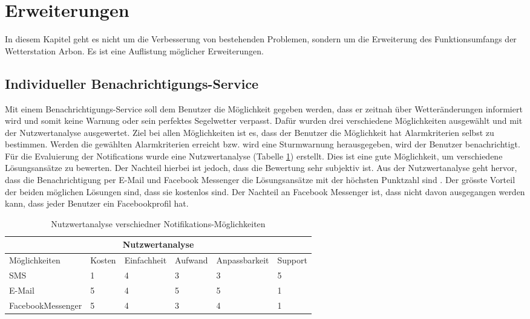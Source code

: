 \section{Erweiterungen}
In diesem Kapitel geht es nicht um die Verbesserung von bestehenden Problemen, sondern um die Erweiterung des Funktionsumfangs der Wetterstation Arbon. Es ist eine Auflistung möglicher Erweiterungen.

\subsection{Individueller Benachrichtigungs-Service}
Mit einem Benachrichtigungs-Service soll dem Benutzer die Möglichkeit gegeben werden, dass er zeitnah über Wetteränderungen informiert wird und somit keine Warnung oder sein perfektes Segelwetter verpasst. Dafür wurden drei verschiedene Möglichkeiten ausgewählt und mit der Nutzwertanalyse ausgewertet. Ziel bei allen Möglichkeiten ist es, dass der Benutzer die Möglichkeit hat Alarmkriterien selbst zu bestimmen. Werden die gewählten Alarmkriterien erreicht bzw. wird eine Sturmwarnung herausgegeben, wird der Benutzer benachrichtigt. Für die Evaluierung der Notifications wurde eine Nutzwertanalyse (Tabelle \ref{table:nutzwertanalyse}) erstellt. Dies ist eine gute Möglichkeit, um verschiedene Lösungsansätze zu bewerten. Der Nachteil hierbei ist jedoch, dass die Bewertung sehr subjektiv ist. Aus der Nutzwertanalyse geht hervor, dass die Benachrichtigung per E-Mail und Facebook Messenger die Lösungsansätze mit der höchsten Punktzahl sind . Der grösste Vorteil der beiden möglichen Lösungen sind, dass sie kostenlos sind. Der Nachteil an Facebook Messenger ist, dass nicht davon ausgegangen werden kann, dass jeder Benutzer ein Facebookprofil hat. 

\begin{table}
\begin{center}
\begin{tabular}{ |p{3.5cm}||p{1.1cm}|p{2cm}|p{1.7cm}|p{2.3cm}|p{1.4cm}|}
 \hline
 \multicolumn{6}{|c|}{Nutzwertanalyse} \\
 \hline
	Möglichkeiten & Kosten & Einfachheit & Aufwand & Anpassbarkeit & Support\\
 \hline
	SMS & 1 & 4 & 3 & 3 & 5\\
	E-Mail & 5 & 4 & 5 & 5 & 1\\
	FacebookMessenger & 5 & 4 & 3 & 4 & 1\\
 
\hline
\end{tabular}
\end{center}
\caption{Nutzwertanalyse verschiedner Notifikations-Möglichkeiten}
\label{table:nutzwertanalyse}
\end{table}


